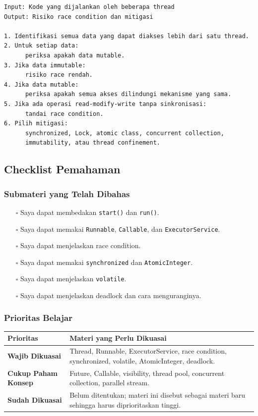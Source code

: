 \begin{lstlisting}[caption={Pseudocode deteksi race condition}, label={lst:race-detection}]
Input: Kode yang dijalankan oleh beberapa thread
Output: Risiko race condition dan mitigasi

1. Identifikasi semua data yang dapat diakses lebih dari satu thread.
2. Untuk setiap data:
      periksa apakah data mutable.
3. Jika data immutable:
      risiko race rendah.
4. Jika data mutable:
      periksa apakah semua akses dilindungi mekanisme yang sama.
5. Jika ada operasi read-modify-write tanpa sinkronisasi:
      tandai race condition.
6. Pilih mitigasi:
      synchronized, Lock, atomic class, concurrent collection,
      immutability, atau thread confinement.
\end{lstlisting}

\subsection{Checklist Pemahaman}

\subsubsection{Submateri yang Telah Dibahas}

\begin{itemize}
    \item[$\square$] Saya dapat membedakan \texttt{start()} dan \texttt{run()}.
    \item[$\square$] Saya dapat memakai \texttt{Runnable}, \texttt{Callable}, dan \texttt{ExecutorService}.
    \item[$\square$] Saya dapat menjelaskan race condition.
    \item[$\square$] Saya dapat memakai \texttt{synchronized} dan \texttt{AtomicInteger}.
    \item[$\square$] Saya dapat menjelaskan \texttt{volatile}.
    \item[$\square$] Saya dapat menjelaskan deadlock dan cara menguranginya.
\end{itemize}

\subsubsection{Prioritas Belajar}

\begin{tabularx}{\textwidth}{|L{0.22\textwidth}|X|}
\hline
\textbf{Prioritas} & \textbf{Materi yang Perlu Dikuasai} \\
\hline
\textbf{Wajib Dikuasai} & Thread, Runnable, ExecutorService, race condition, synchronized, volatile, AtomicInteger, deadlock. \\
\hline
\textbf{Cukup Paham Konsep} & Future, Callable, visibility, thread pool, concurrent collection, parallel stream. \\
\hline
\textbf{Sudah Dikuasai} & Belum ditentukan; materi ini disebut sebagai materi baru sehingga harus diprioritaskan tinggi. \\
\hline
\end{tabularx}
